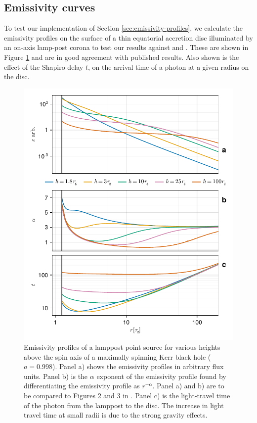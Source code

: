 \documentclass[fleqn,usenatbib]{mnras}
\begin{document}
\subsection{Emissivity curves}

To test our implementation of Section \ref{sec:emissivity-profiles}, we
calculate the emissivity profiles on the surface of a thin equatorial accretion
disc illuminated by an on-axis lamp-post corona to test our results against
\cite{wilkins_understanding_2012} and \cite{dauser_irradiation_2013}. These are
shown in Figure \ref{fig:emissivity-profiles} and are in good agreement with
published results. Also shown is the effect of the Shapiro delay $t$, on the
arrival time of a photon at a given radius on the disc.

\begin{figure}
	\centering
	\includegraphics[width=0.99\linewidth]{figures/emissivity.point-source.pdf}
    \caption{Emissivity profiles of a lamppost point source for various heights
        above the spin axis of a maximally spinning Kerr black hole ($a =
        0.998$). Panel a) shows the emissivity profiles in arbitrary flux units.
        Panel b) is the $\alpha$ exponent of the emissivity profile found by
        differentiating the emissivity profile as $r^{-\alpha}$.  Panel a) and
        b) are to be compared to Figures 2 and 3 in
        \citet{dauser_irradiation_2013}. Panel c) is the light-travel time of
        the photon from the lamppost to the disc. The increase in light travel
        time at small radii is due to the strong gravity effects.
}
	\label{fig:emissivity-profiles}
\end{figure}
\end{document}
